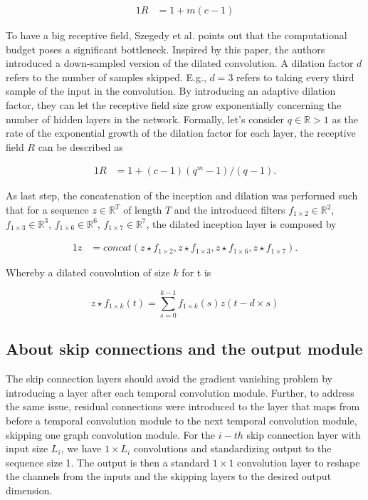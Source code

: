\documentclass[letterpaper, twocolumn,11pt]{article}
\begin{document}
    \begin{alignat}{1}
        R &= 1 + m(c-1)  \label{eq:receptive_field}
    \end{alignat}

    To have a big receptive field, Szegedy et al. \cite{Szegedy_2015_CVPR} points out that the computational budget poses a significant bottleneck.
    Inspired by this paper, the authors introduced a down-sampled version of the dilated convolution.
    A dilation factor $d$ refers to the number of samples skipped. E.g., $d=3$ refers to taking every third sample of the input in the convolution.
    By introducing an adaptive dilation factor, they can let the receptive field size grow exponentially concerning the number of hidden layers in the network.
    Formally, let's consider $q \in \mathbb{R}>1$ as the rate of the exponential growth of the dilation factor for each layer,
    the receptive field $R$ can be described as

    \begin{alignat}{1}
        R &= 1 + (c-1)(q^m-1)/(q-1).  \label{eq:adaptive_receptive_field}
    \end{alignat}


    As last step, the concatenation of the inception and dilation was performed such that for a sequence $z \in \mathbb{R}^T$ of length $T$ and the introduced filters
    $f_{1 \times 2} \in \mathbb{R}^2$,
    $f_{1 \times 3} \in \mathbb{R}^3$,
    $f_{1 \times 6} \in \mathbb{R}^6$,
    $f_{1 \times 7} \in \mathbb{R}^7$,
    the dilated inception layer is composed by

    \begin{alignat}{1}
        z &= concat(
        z \star f_{1 \times 2},
        z \star f_{1 \times 3},
        z \star f_{1 \times 6},
        z \star f_{1 \times 7}
        ).
        \label{eq:dilated_inception_layer_wrt_z}
    \end{alignat}

    Whereby a dilated convolution of size $k$ for t is

    \begin{equation}
        z \star f_{1 \times k}(t) = \sum_{s=0}^{k-1} f_{1 \times k}(s)z(t-d \times s)
    \end{equation}

    \subsection{About skip connections and the output module}
    The skip connection layers should avoid the gradient vanishing problem by introducing a layer after each temporal convolution module.
    Further, to address the same issue, residual connections were introduced to the layer that maps from before a temporal convolution module to the next temporal convolution module, skipping one graph convolution module.
    For the $i-th$ skip connection layer with input size $L_i$, we have  $1 \times L_i$ convolutions and standardizing output to the sequence size 1.
    The output is then a standard $ 1 \times 1$ convolution layer to reshape the channels from the inputs and the skipping layers to the desired output dimension.
\end{document}
